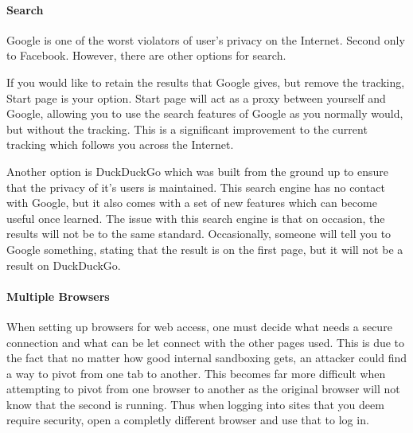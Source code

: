 \documentclass[a4paper,11pt]{article}
\begin{document}
		\paragraph{Search}
			Google is one of the worst violators of user's privacy on the Internet. Second only to Facebook. 
			However, there are other options for search. \par 
			If you would like to retain the results that Google gives, but remove the tracking, Start page is your option. 
			Start page will act as a proxy between yourself and Google, allowing you to use the search features of Google as you normally would, but without the tracking. 
			This is a significant improvement to the current tracking which follows you across the Internet. \par 
			Another option is DuckDuckGo which was built from the ground up to ensure that the privacy of it's users is maintained. 
			This search engine has no contact with Google, but it also comes with a set of new features which can become useful once learned. 
			The issue with this search engine is that on occasion, the results will not be to the same standard. 
			Occasionally, someone will tell you to Google something, stating that the result is on the first page, but it will not be a result on DuckDuckGo. 
		\paragraph{Multiple Browsers}
			When setting up browsers for web access, one must decide what needs a secure connection and what can be let connect with the other pages used. 
			This is due to the fact that no matter how good internal sandboxing gets, an attacker could find a way to pivot from one tab to another. 
			This becomes far more difficult when attempting to pivot from one browser to another as the original browser will not know that the second is running. 
			Thus when logging into sites that you deem require security, open a completly different browser and use that to log in. 
\end{document}
